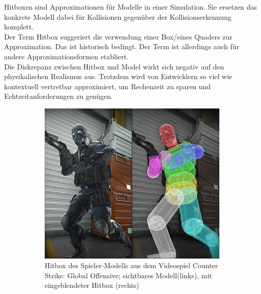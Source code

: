 \label{sec:hitbox}
Hitboxen sind Approximationen für Modelle in einer Simulation. Sie ersetzen das konkrete Modell dabei für Kollisionen gegenüber der Kollisionserkennung komplett.\\
Der Term Hitbox suggeriert die verwendung einer Box/eines Quaders zur Approximation. Das ist historisch bedingt. Der Term ist allerdings auch für andere Approximationsformen etabliert.\\
Die Diskrepanz zwischen Hitbox und Model wirkt sich negativ auf den physikalischen Realismus aus. Trotzdem wird von Entwicklern so viel wie kontextuell vertretbar approximiert, um Rechenzeit zu sparen und Echtzeitanforderungen zu genügen.

\begin{figure}
	\begin{subfigure}[t]{0.45\textwidth}
		\centering
		\includegraphics[width=1\textwidth]{./res/csgo_hitbox.png}
		\caption{Hitbox des Spieler-Modells aus dem Videospiel Counter Strike: Global Offensive; sichtbares Modell(links), mit eingeblendeter Hitbox (rechts)}
		\label{fig:chitbox}
	\end{subfigure}
~
	\begin{subfigure}[t]{0.2\textwidth}
		\centering

\end{subfigure}
\end{figure}
